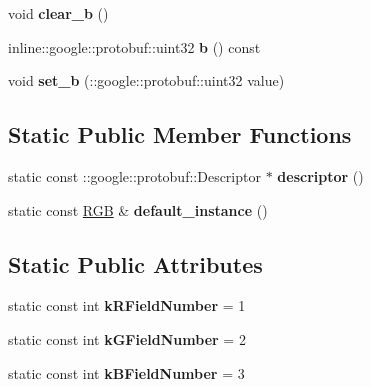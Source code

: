 \begin{DoxyCompactItemize}
\item 
void {\bfseries clear\+\_\+b} ()\hypertarget{classvss__state_1_1RGB_a3b8c5f9250f44c8d0f987bcf10abdc64}{}\label{classvss__state_1_1RGB_a3b8c5f9250f44c8d0f987bcf10abdc64}

\item 
inline\+::google\+::protobuf\+::uint32 {\bfseries b} () const \hypertarget{classvss__state_1_1RGB_ac59c6fa5dafec18a115e3a00cd1fa68e}{}\label{classvss__state_1_1RGB_ac59c6fa5dafec18a115e3a00cd1fa68e}

\item 
void {\bfseries set\+\_\+b} (\+::google\+::protobuf\+::uint32 value)\hypertarget{classvss__state_1_1RGB_a3977bb063a529efca387875a69a5b465}{}\label{classvss__state_1_1RGB_a3977bb063a529efca387875a69a5b465}

\end{DoxyCompactItemize}
\subsection*{Static Public Member Functions}
\begin{DoxyCompactItemize}
\item 
static const \+::google\+::protobuf\+::\+Descriptor $\ast$ {\bfseries descriptor} ()\hypertarget{classvss__state_1_1RGB_a64df354aa51e9fb966ee23e03a5e9329}{}\label{classvss__state_1_1RGB_a64df354aa51e9fb966ee23e03a5e9329}

\item 
static const \hyperlink{classvss__state_1_1RGB}{R\+GB} \& {\bfseries default\+\_\+instance} ()\hypertarget{classvss__state_1_1RGB_a82e155d80791f80c397423d539f03614}{}\label{classvss__state_1_1RGB_a82e155d80791f80c397423d539f03614}

\end{DoxyCompactItemize}
\subsection*{Static Public Attributes}
\begin{DoxyCompactItemize}
\item 
static const int {\bfseries k\+R\+Field\+Number} = 1\hypertarget{classvss__state_1_1RGB_a6b14019e7583f983a0dc0e0c713767e5}{}\label{classvss__state_1_1RGB_a6b14019e7583f983a0dc0e0c713767e5}

\item 
static const int {\bfseries k\+G\+Field\+Number} = 2\hypertarget{classvss__state_1_1RGB_a7f4f93a87024582ed9aa94ad501aacc0}{}\label{classvss__state_1_1RGB_a7f4f93a87024582ed9aa94ad501aacc0}

\item 
static const int {\bfseries k\+B\+Field\+Number} = 3\hypertarget{classvss__state_1_1RGB_a2c4583771ba2ee5b0f6798c7ee082b3e}{}\label{classvss__state_1_1RGB_a2c4583771ba2ee5b0f6798c7ee082b3e}

\end{DoxyCompactItemize}
